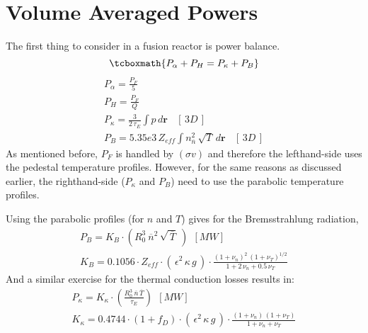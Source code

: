 \section{Volume Averaged Powers}

The first thing to consider in a fusion reactor is power balance. 
\label{pwr_bal}
\begin{equation}
\tcboxmath{
P_\alpha + P_H = P_\kappa + P_B }
\end{equation}
\begin{gather}
	P_\alpha = \frac{P_F}{5} \\
	P_H = \frac{P_F}{Q} \\
	P_\kappa = \frac{3}{2 \, \tau_E} \int p \, d\textbf{r} \ \ \ \ [ \, 3D \, ] \\
	P_B = 5.35e3 \, Z_{eff} \int n_{\overline{n}}^2 \, \sqrt{T} \, d\textbf{r} \ \ \ \ [ \, 3D \, ]
\end{gather}
As mentioned before, $P_F$ is handled by $(\sigma v)$ and therefore the lefthand-side uses the pedestal temperature profiles. However, for the same reasons as discussed earlier, the righthand-side ($P_\kappa$ and $P_B$) need to use the parabolic temperature profiles.

Using the parabolic profiles (for $n$ and $T$) gives for the Bremsstrahlung radiation,
\begin{gather}
	P_B = K_B \cdot \left( R_0^3 \ \overline{n}^2 \, \sqrt{\,\overline{T}} \ \right) \ \ [MW] \\
	K_B = 0.1056 \cdot Z_{eff} \cdot ( \, \epsilon^2 \, \kappa \, g \, ) \cdot \frac{ (1+\nu_n)^2 \, (1+\nu_T)^{1/2} }{1+2 \, \nu_n + 0.5 \, \nu_T}
\end{gather}
And a similar exercise for the thermal conduction losses results in:
\begin{gather}
	P_\kappa = K_\kappa \cdot \left( \frac{ R_0 ^ 3 \ \overline{n}  \, \overline{T} }{\tau_E} \right) \ \ [MW] \\
	K_\kappa = 0.4744 \cdot  ( 1 + f_D ) \cdot ( \, \epsilon^2 \, \kappa \, g \, ) \cdot \frac{ (1 + \nu_n) \, (1 + \nu_T) }{1 + \nu_n + \nu_T }
\end{gather}

\clearpage
\newpage





